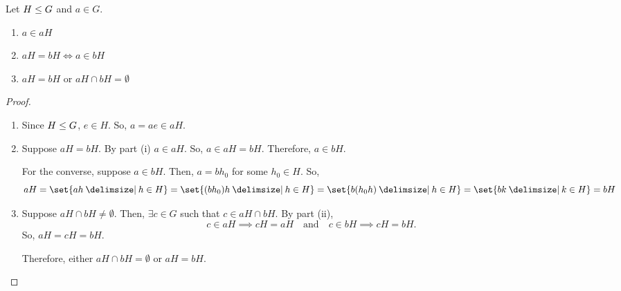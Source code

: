 \documentclass[11pt]{penrose}
\begin{document}
\begin{nthm}\label{thm:coset-properties-a}
    Let $H \mathrel{\leq} G$ and $a \in G$.
    \begin{enumerate}[label=(\roman*)]
        \item $a \in aH$
        \item $aH = bH \iff a \in bH$
        \item $aH = bH$ or $aH \cap bH = \emptyset$
    \end{enumerate}
\end{nthm}
\begin{proof}
    \begin{enumerate}[label=(\roman*)]
        \item Since $H \mathrel{\leq} G$, $e \in H$. So, $a = ae \in aH$.

        \item Suppose $aH = bH$. By part (i) $a \in aH$. So, $a \in aH = bH$. Therefore, $a \in bH$.

        For the converse, suppose $a \in bH$. Then, $a = bh_0$ for some $h_0 \in H$. So,
        \begin{equation*}
            aH
            = \set{ah \st h \in H}
            = \set{(bh_0)h \st h \in H}
            = \set{b(h_0 h) \st h \in H}
            = \set{bk \st k \in H}
            = bH
        \end{equation*}

        \item Suppose $aH \cap bH \neq \emptyset$. Then, $\exists c \in G$ such that $c \in aH \cap bH$. By part (ii),
        \begin{equation*}
            c \in aH \implies cH = aH
            \quad\text{and}\quad
            c \in bH \implies cH = bH.
        \end{equation*}
        So, $aH = cH = bH$.

        Therefore, either $aH \cap bH = \emptyset$ or $aH = bH$.\qedhere
    \end{enumerate}
\end{proof}
\end{document}
